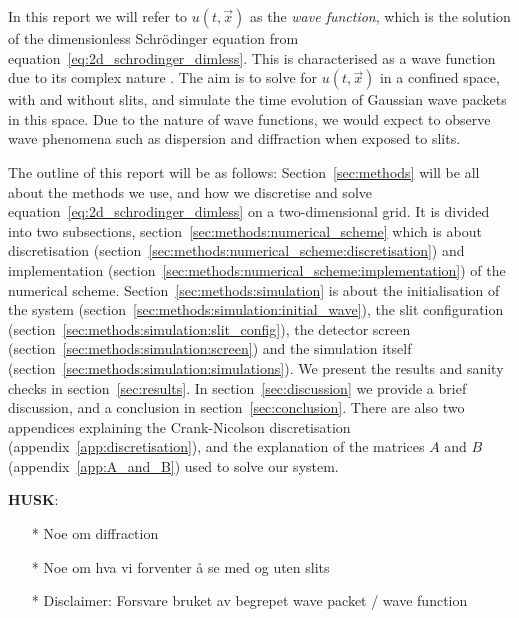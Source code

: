 In this report we will refer to $u(t, \vec{x})$ as the \textit{wave function}, which is the solution of the dimensionless Schrödinger equation from equation~\eqref{eq:2d_schrodinger_dimless}. This is characterised as a wave function due to its complex nature . The aim is to solve for $u(t,\vec{x})$ in a confined space, with and without slits, and simulate the time evolution of Gaussian wave packets in this space. Due to the nature of wave functions, we would expect to observe wave phenomena such as dispersion and diffraction when exposed to slits. 

The outline of this report will be as follows: Section~\ref{sec:methods} will be all about the methods we use, and how we discretise and solve equation~\eqref{eq:2d_schrodinger_dimless} on a two-dimensional grid. It is divided into two subsections, section~\ref{sec:methods:numerical_scheme} which is about discretisation (section~\ref{sec:methods:numerical_scheme:discretisation}) and implementation (section~\ref{sec:methods:numerical_scheme:implementation}) of the numerical scheme. Section~\ref{sec:methods:simulation} is about the initialisation of the system (section~\ref{sec:methods:simulation:initial_wave}), the slit configuration (section~\ref{sec:methods:simulation:slit_config}), the detector screen (section~\ref{sec:methods:simulation:screen}) and the simulation itself (section~\ref{sec:methods:simulation:simulations}). We present the results and sanity checks in section~\ref{sec:results}. In section~\ref{sec:discussion} we provide a brief discussion, and a conclusion in section~\ref{sec:conclusion}. There are also two appendices explaining the Crank-Nicolson discretisation (appendix~\ref{app:discretisation}), and the explanation of the matrices $A$ and $B$ (appendix~\ref{app:A_and_B}) used to solve our system. 



\textbf{HUSK}:
\begin{enumerate}
    \item[*] Noe om diffraction 
    \item[*] Noe om hva vi forventer å se med og uten slits 
    \item[*] Disclaimer: Forsvare bruket av begrepet wave packet / wave function 
\end{enumerate}









